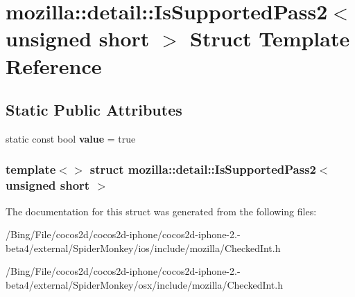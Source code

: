 \hypertarget{structmozilla_1_1detail_1_1_is_supported_pass2_3_01unsigned_01short_01_4}{\section{mozilla\-:\-:detail\-:\-:Is\-Supported\-Pass2$<$ unsigned short $>$ Struct Template Reference}
\label{structmozilla_1_1detail_1_1_is_supported_pass2_3_01unsigned_01short_01_4}
}
\subsection*{Static Public Attributes}
\begin{DoxyCompactItemize}
\item 
\hypertarget{structmozilla_1_1detail_1_1_is_supported_pass2_3_01unsigned_01short_01_4_a184825f1a6594e23f65bde1f28d64c53}{static const bool {\bfseries value} = true}\label{structmozilla_1_1detail_1_1_is_supported_pass2_3_01unsigned_01short_01_4_a184825f1a6594e23f65bde1f28d64c53}

\end{DoxyCompactItemize}
\subsubsection*{template$<$$>$ struct mozilla\-::detail\-::\-Is\-Supported\-Pass2$<$ unsigned short $>$}



The documentation for this struct was generated from the following files\-:\begin{DoxyCompactItemize}
\item 
/\-Bing/\-File/cocos2d/cocos2d-\/iphone/cocos2d-\/iphone-\/2.-\/beta4/external/\-Spider\-Monkey/ios/include/mozilla/Checked\-Int.\-h\item 
/\-Bing/\-File/cocos2d/cocos2d-\/iphone/cocos2d-\/iphone-\/2.-\/beta4/external/\-Spider\-Monkey/osx/include/mozilla/Checked\-Int.\-h\end{DoxyCompactItemize}
